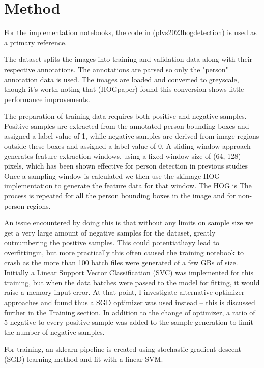 \section{Method}

For the implementation notebooks, the code in (plvs2023hogdetection) is used as a primary reference. 


The dataset splits the images into training and validation data along with their respective annotations. 
The annotations are parsed so only the "person" annotation data is used.
The images are loaded and converted to greyscale, though it's worth noting that (HOGpaper) found this conversion shows little performance improvements.

The preparation of training data requires both positive and negative samples. 
Positive samples are extracted from the annotated person bounding boxes and assigned a label value of 1, while negative samples are derived from image regions outside these boxes and assigned a label value of 0. 
A sliding window approach generates feature extraction windows, using a fixed window size of (64, 128) pixels, which has been shown effective for person detection in previous studies
Once a sampling window is calculated we then use the skimage HOG implementation to generate the feature data for that window.
The HOG is 
The process is repeated for all the person bounding boxes in the image and for non-person regions.

An issue encountered by doing this is that without any limits on sample size we get a very large amount of negative samples for the dataset, greatly outnumbering the positive samples.
This could potentiatliayy lead to overfittingm, but more practically this often caused the training notebook to crash as the more than 100 batch files were generated of a few GBs of size. 
Initially a Linear Support Vector Classification (SVC)  was implemented for this training, but when the data batches were passed to the model for fitting, it would raise a memory input error. 
At that point, I investigate alternative optimizer approaches and found 
thus a SGD optimizer was used instead -- this is discussed further in the Training section.
In addition to the change of optimizer, a ratio of 5 negative to every positive sample was added to the sample generation to limit the number of negative samples.


For training, an sklearn pipeline is created using stochastic gradient descent (SGD) learning method and fit with a linear SVM. 

